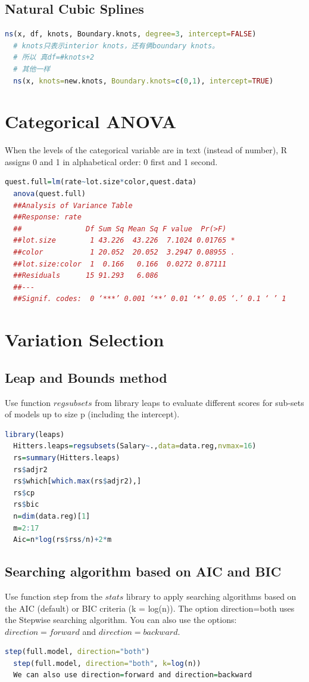 \documentclass[11pt,a4paper]{article}
\begin{document}
\subsection{Natural Cubic Splines}
\begin{lstlisting}[language=R]
  ns(x, df, knots, Boundary.knots, degree=3, intercept=FALSE)
  # knots只表示interior knots，还有俩boundary knots。
  # 所以 真df=#knots+2
  # 其他一样
  ns(x, knots=new.knots, Boundary.knots=c(0,1), intercept=TRUE)
\end{lstlisting}



\section{Categorical ANOVA}
When the levels of the categorical variable are in text (instead of number), R assigns 0 and 1 in alphabetical order: 0 first and 1 second.

\begin{lstlisting}[language=R]
  quest.full=lm(rate~lot.size*color,quest.data)
  anova(quest.full)
  ##Analysis of Variance Table
  ##Response: rate
  ##               Df Sum Sq Mean Sq F value  Pr(>F)  
  ##lot.size        1 43.226  43.226  7.1024 0.01765 *
  ##color           1 20.052  20.052  3.2947 0.08955 .
  ##lot.size:color  1  0.166   0.166  0.0272 0.87111  
  ##Residuals      15 91.293   6.086                  
  ##---
  ##Signif. codes:  0 ‘***’ 0.001 ‘**’ 0.01 ‘*’ 0.05 ‘.’ 0.1 ‘ ’ 1
\end{lstlisting}



\section{Variation Selection}
\subsection{Leap and Bounds method}
Use function $regsubsets$ from library leaps to evaluate different scores for sub-sets of models up to size p (including the intercept).
\begin{lstlisting}[language=R]
  library(leaps)
  Hitters.leaps=regsubsets(Salary~.,data=data.reg,nvmax=16)
  rs=summary(Hitters.leaps)
  rs$adjr2
  rs$which[which.max(rs$adjr2),]
  rs$cp
  rs$bic
  n=dim(data.reg)[1]
  m=2:17
  Aic=n*log(rs$rss/n)+2*m
\end{lstlisting}
\subsection{Searching algorithm based on AIC and BIC}
Use function step from the $stats$ library to apply searching algorithms based on the AIC (default) or BIC criteria (k = log(n)). The option direction=both uses the Stepwise searching algorithm. You can also use the options: $direction=forward$ and $direction=backward$.
\begin{lstlisting}[language=R]
  step(full.model, direction="both")
  step(full.model, direction="both", k=log(n))
  We can also use direction=forward and direction=backward
\end{lstlisting}
\end{document}
